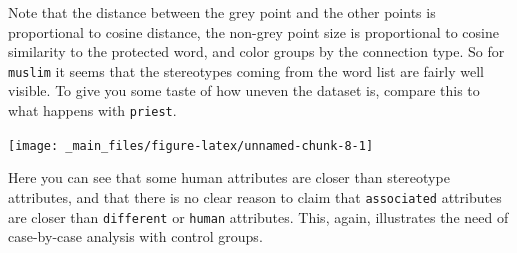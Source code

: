 \documentclass[12pt,]{book}
\newenvironment{Shaded}{\begin{snugshade}}{\end{snugshade}}
\newcommand{\KeywordTok}[1]{\textcolor[rgb]{0.13,0.29,0.53}{\textbf{#1}}}
\newcommand{\DecValTok}[1]{\textcolor[rgb]{0.00,0.00,0.81}{#1}}
\newcommand{\StringTok}[1]{\textcolor[rgb]{0.31,0.60,0.02}{#1}}
\newcommand{\CommentTok}[1]{\textcolor[rgb]{0.56,0.35,0.01}{\textit{#1}}}
\newcommand{\OperatorTok}[1]{\textcolor[rgb]{0.81,0.36,0.00}{\textbf{#1}}}
\newcommand{\NormalTok}[1]{#1}
\begin{document}
\normalsize

Note that the distance between the grey point and the other points is
proportional to cosine distance, the non-grey point size is proportional
to cosine similarity to the protected word, and color groups by the
connection type. So for \texttt{muslim} it seems that the stereotypes
coming from the word list are fairly well visible. To give you some
taste of how uneven the dataset is, compare this to what happens with
\texttt{priest}.

\vspace{1mm} \footnotesize

\begin{Shaded}
\end{Shaded}

\begin{center}\texttt{[image: \_main\_files/figure-latex/unnamed-chunk-8-1]} \end{center}

\normalsize

\noindent Here you can see that some human attributes are closer than
stereotype attributes, and that there is no clear reason to claim that
\texttt{associated} attributes are closer than \texttt{different} or
\texttt{human} attributes. This, again, illustrates the need of
case-by-case analysis with control groups.
\end{document}
